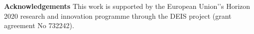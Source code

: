 \documentclass[preprint,11pt,authoryear]{elsarticle}
\begin{document}









\vspace{2em}
\noindent\textbf{Acknowledgements}
This work is supported by the European Union'’s Horizon 2020 research and innovation programme through the DEIS project (grant agreement No 732242). 




\end{document}
